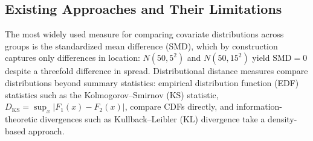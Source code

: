 \documentclass[AMA,Times1COL]{WileyNJDv5}
\begin{document}
\subsection{Existing Approaches and Their Limitations}\label{sec:existing}

The most widely used measure for comparing covariate distributions across groups is the standardized mean difference (SMD),\cite{austin2011} which by construction captures only differences in location: $N(50, 5^2)$ and $N(50, 15^2)$ yield $\text{SMD} = 0$ despite a threefold difference in spread. Distributional distance measures compare distributions beyond summary statistics: empirical distribution function (EDF) statistics such as the Kolmogorov--Smirnov (KS) statistic, $D_{\text{KS}} = \sup_x |F_1(x) - F_2(x)|$, compare CDFs directly, and information-theoretic divergences such as Kullback--Leibler (KL) divergence take a density-based approach.
\end{document}
